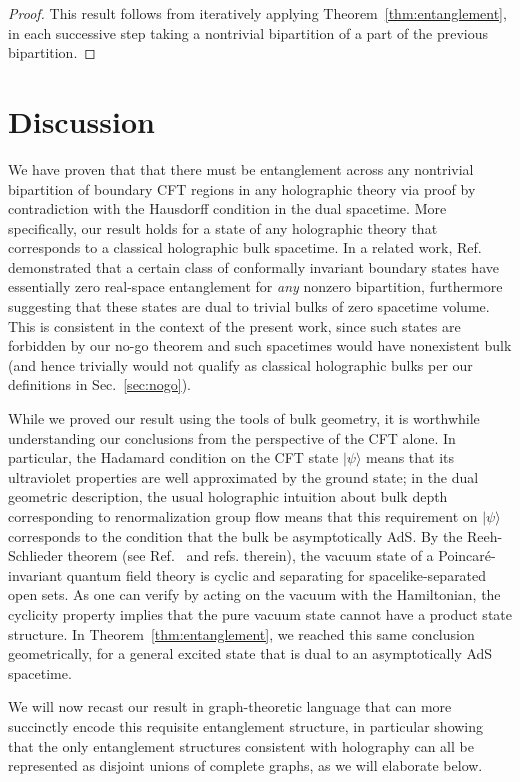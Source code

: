\documentclass[12pt,english]{article}
\newcommand{\Ref}[1]{Ref.~\cite{#1}}
\newcommand{\Sec}[1]{Sec.~\ref{#1}}
\begin{document}
\begin{proof}
This result follows from iteratively applying Theorem~\ref{thm:entanglement}, in each successive step taking a nontrivial bipartition of a part of the previous bipartition.
\end{proof}

\section{Discussion}\label{sec:discussion}
We have proven that that there must be entanglement across any nontrivial bipartition of boundary CFT regions in any holographic theory via proof by contradiction with the Hausdorff condition in the dual spacetime. More specifically, our result holds for a state of any holographic theory that corresponds to a classical holographic bulk spacetime. In a related work, \Ref{Miyaji:2014mca} demonstrated that a certain class of conformally invariant boundary states have essentially zero real-space entanglement for {\it any} nonzero bipartition, furthermore suggesting that these states are dual to trivial bulks of zero spacetime volume. This is consistent in the context of the present work, since such states are forbidden by our no-go theorem and such spacetimes would have nonexistent bulk (and hence trivially would not qualify as classical holographic bulks per our definitions in \Sec{sec:nogo}). 

While we proved our result using the tools of bulk geometry, it is worthwhile understanding our conclusions from the perspective of the CFT alone. In particular, the Hadamard condition \cite{Kay:1988mu} on the CFT state $|\psi\rangle$ means that its ultraviolet properties are well approximated by the ground state; in the dual geometric description, the usual holographic intuition about bulk depth corresponding to renormalization group flow means that this requirement on $|\psi\rangle$ corresponds to the condition that the bulk be asymptotically AdS. By the Reeh-Schlieder theorem (see \Ref{Witten:2018zxz} and refs. therein), the vacuum state of a Poincar\'e-invariant quantum field theory is cyclic and separating for spacelike-separated open sets. As one can verify by acting on the vacuum with the Hamiltonian, the cyclicity property implies that the pure vacuum state cannot have a product state structure. In Theorem~\ref{thm:entanglement}, we reached this same conclusion geometrically, for a general excited state that is dual to an asymptotically AdS spacetime.

We will now recast our result in graph-theoretic language that can more succinctly encode this requisite entanglement structure, in particular showing that the only entanglement structures consistent with holography can all be represented as disjoint unions of complete graphs, as we will elaborate below.
\end{document}

